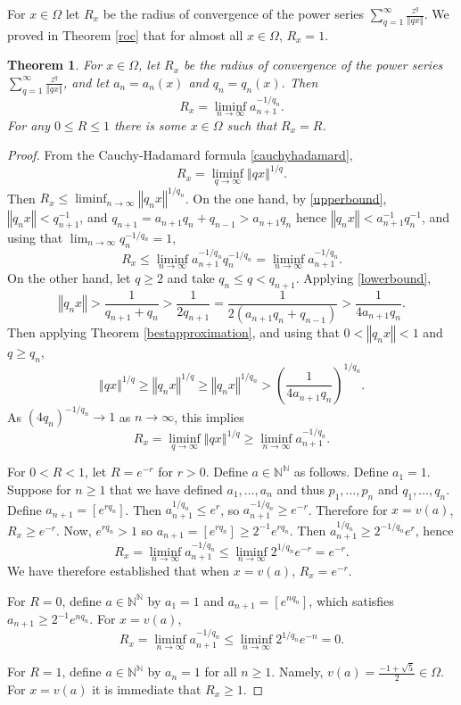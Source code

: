 \documentclass{amsart}
\newcommand{\norm}[1]{\left\Vert #1 \right\Vert}
\newtheorem{theorem}{Theorem}
\begin{document}
For $x \in \Omega$ let $R_x$ be the radius of convergence of the power series $\sum_{q=1}^\infty \frac{z^q}{\norm{qx}}$. 
We proved in Theorem \ref{roc} that for almost all $x \in \Omega$, $R_x=1$. 

\begin{theorem}
For  $x \in \Omega$, let $R_x$ be the radius of convergence of the power series $\sum_{q=1}^\infty \frac{z^q}{\norm{qx}}$, and let
$a_n=a_n(x)$ and $q_n=q_n(x)$. Then
\[
R_x = \liminf_{n \to \infty} a_{n+1}^{-1/q_n}.
\]
For any $0 \leq R \leq 1$ there is some $x \in \Omega$ such that $R_x=R$. 
\end{theorem}
\begin{proof}
From the Cauchy-Hadamard formula \eqref{cauchyhadamard},
\[
R_x =\liminf_{q \to \infty} \norm{qx}^{1/q}.
\]
Then $R_x \leq \liminf_{n \to \infty} \norm{q_n x}^{1/q_n}$. 
On the one hand, by \eqref{upperbound}, 
$\norm{q_n x}<q_{n+1}^{-1}$, 
and $q_{n+1} = a_{n+1} q_n + q_{n-1} > a_{n+1} q_n$ hence
$\norm{q_n x} < a_{n+1}^{-1} q_n^{-1}$, and using that
$\lim_{n \to \infty} q_n^{-1/q_n}=1$,
\[
R_x \leq \liminf_{n \to \infty} a_{n+1}^{-1/q_n} q_n^{-1/q_n}
=\liminf_{n \to \infty} a_{n+1}^{-1/q_n}.
\]
On the other hand, let $q \geq 2$ and take $q_n \leq q < q_{n+1}$. 
Applying \eqref{lowerbound},
\[
\norm{q_n x} > \frac{1}{q_{n+1}+q_n} 
> \frac{1}{2q_{n+1}} = 
\frac{1}{2(a_{n+1}q_n+q_{n-1})}
> \frac{1}{4a_{n+1} q_n}.
\]
Then applying Theorem \ref{bestapproximation}, and using that $0<\norm{q_n x}<1$ and
$q \geq q_n$,
\[
\norm{q x}^{1/q} \geq \norm{q_n x}^{1/q}
\geq \norm{q_n x}^{1/q_n} >
\left( \frac{1}{4a_{n+1} q_n} \right)^{1/q_n}.
\]
As $(4q_n)^{-1/q_n} \to 1$ as $n \to \infty$, this implies
\[
R_x = \liminf_{q \to \infty} \norm{q x}^{1/q} \geq \liminf_{n \to \infty} a_{n+1}^{-1/q_n}.
\]

For $0<R<1$, let $R=e^{-r}$ for $r>0$. Define $a \in \mathbb{N}^\mathbb{N}$ as follows.
Define $a_1=1$. Suppose for $n \geq 1$ that we have defined $a_1,\ldots,a_n$
and thus $p_1,\ldots,p_n$ and $q_1,\ldots,q_n$. 
Define
$a_{n+1} = [e^{r q_n}]$.
Then 
$a_{n+1}^{1/q_n} \leq e^r$, so $a_{n+1}^{-1/q_n} \geq e^{-r}$. Therefore for $x=v(a)$, $R_x \geq e^{-r}$. 
Now, $e^{rq_n}>1$ so $a_{n+1}=[e^{rq_n}] \geq 2^{-1} e^{rq_n}$. Then $a_{n+1}^{1/q_n} \geq 2^{-1/q_n}
e^r$, hence
\[
R_x = \liminf_{n \to \infty} a_{n+1}^{-1/q_n} \leq  \liminf_{n \to \infty} 2^{1/q_n} e^{-r} = e^{-r}.
\]
We have therefore established that when $x=v(a)$, $R_x = e^{-r}$. 

For $R=0$, define $a \in \mathbb{N}^\mathbb{N}$ by
$a_1=1$ and $a_{n+1} = [e^{nq_n}]$, which satisfies
$a_{n+1} \geq 2^{-1} e^{nq_n}$. For
$x=v(a)$,
\[
R_x = \liminf_{n \to \infty} a_{n+1}^{-1/q_n} \leq 
\liminf_{n \to \infty} 2^{1/q_n} e^{-n} = 0.
\]

For $R=1$, define $a \in \mathbb{N}^\mathbb{N}$ by $a_n=1$ for all $n \geq 1$.
Namely, $v(a) = \frac{-1+\sqrt{5}}{2} \in \Omega$. 
For $x=v(a)$ it is immediate that $R_x \geq 1$.
\end{proof}
\end{document}
